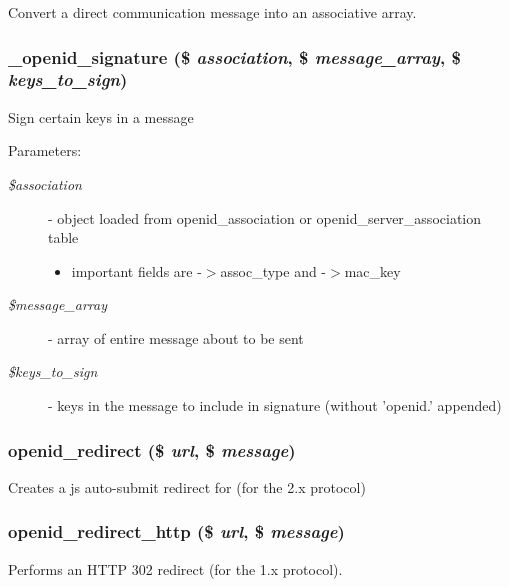 Convert a direct communication message into an associative array. \hypertarget{openid_8inc_94a239a1dacef65306d0078198035cc7}{
\subsubsection[{\_\-openid\_\-signature}]{\setlength{\rightskip}{0pt plus 5cm}\_\-openid\_\-signature (\$ {\em association}, \/  \$ {\em message\_\-array}, \/  \$ {\em keys\_\-to\_\-sign})}}
\label{openid_8inc_94a239a1dacef65306d0078198035cc7}


Sign certain keys in a message \begin{Desc}
\item[Parameters:]
\begin{description}
\item[{\em \$association}]- object loaded from openid\_\-association or openid\_\-server\_\-association table\begin{itemize}
\item important fields are -$>$assoc\_\-type and -$>$mac\_\-key \end{itemize}
\item[{\em \$message\_\-array}]- array of entire message about to be sent \item[{\em \$keys\_\-to\_\-sign}]- keys in the message to include in signature (without 'openid.' appended) \end{description}
\end{Desc}
\hypertarget{openid_8inc_6836e61a578613959fe00ca83209ae2f}{
\subsubsection[{openid\_\-redirect}]{\setlength{\rightskip}{0pt plus 5cm}openid\_\-redirect (\$ {\em url}, \/  \$ {\em message})}}
\label{openid_8inc_6836e61a578613959fe00ca83209ae2f}


Creates a js auto-submit redirect for (for the 2.x protocol) \hypertarget{openid_8inc_3c8b7c23742c62aae323c74c8c0f9915}{
\subsubsection[{openid\_\-redirect\_\-http}]{\setlength{\rightskip}{0pt plus 5cm}openid\_\-redirect\_\-http (\$ {\em url}, \/  \$ {\em message})}}
\label{openid_8inc_3c8b7c23742c62aae323c74c8c0f9915}


Performs an HTTP 302 redirect (for the 1.x protocol). 